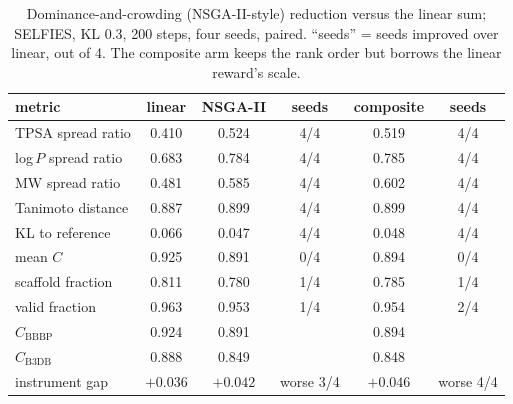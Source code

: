 \documentclass[10pt,letterpaper]{article}
\begin{document}
\begin{table}[!htbp]\centering\small
\caption{Screening verdict by arm for every pooled generated molecule (mean reward-ensemble $C$). Undersized molecules score highest in every arm.}
\label{tab:s6}
\end{table}

\begin{table}[!htbp]\centering
\caption{Dominance-and-crowding (NSGA-II-style) reduction versus the linear sum; SELFIES, KL 0.3, 200 steps, four seeds, paired. ``seeds'' = seeds improved over linear, out of 4. The composite arm keeps the rank order but borrows the linear reward's scale.}
\label{tab:s8}
\begin{tabular}{@{}lccccc@{}}\toprule
metric & linear & NSGA-II & seeds & composite & seeds\\\midrule
TPSA spread ratio & 0.410 & 0.524 & 4/4 & 0.519 & 4/4\\
log\,$P$ spread ratio & 0.683 & 0.784 & 4/4 & 0.785 & 4/4\\
MW spread ratio & 0.481 & 0.585 & 4/4 & 0.602 & 4/4\\
Tanimoto distance & 0.887 & 0.899 & 4/4 & 0.899 & 4/4\\
KL to reference & 0.066 & 0.047 & 4/4 & 0.048 & 4/4\\
mean $C$ & 0.925 & 0.891 & 0/4 & 0.894 & 0/4\\
scaffold fraction & 0.811 & 0.780 & 1/4 & 0.785 & 1/4\\
valid fraction & 0.963 & 0.953 & 1/4 & 0.954 & 2/4\\\midrule
$C_{\text{BBBP}}$ & 0.924 & 0.891 & & 0.894 & \\
$C_{\text{B3DB}}$ & 0.888 & 0.849 & & 0.848 & \\
instrument gap & $+0.036$ & $+0.042$ & worse 3/4 & $+0.046$ & worse 4/4\\\bottomrule
\end{tabular}
\end{table}
\end{document}
